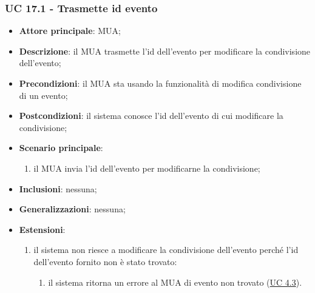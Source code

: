     \subsubsection{UC 17.1 - Trasmette id evento} \label{sec:UC17.1}
    \begin{itemize}
        \item \textbf{Attore principale}: MUA;
        \item \textbf{Descrizione}: il MUA trasmette l'id dell'evento per modificare la condivisione dell'evento;
        \item \textbf{Precondizioni}: il MUA sta usando la funzionalità di modifica condivisione di un evento;
        \item \textbf{Postcondizioni}: il sistema conosce l'id dell'evento di cui modificare la condivisione;
        \item \textbf{Scenario principale}:
            \begin{enumerate}
                \item il MUA invia l'id dell'evento per modificarne la condivisione;
            \end{enumerate}
        \item \textbf{Inclusioni}: nessuna;
        \item \textbf{Generalizzazioni}: nessuna;
        \item \textbf{Estensioni}:
            \begin{enumerate}[label=\alph*.]
                \item il sistema non riesce a modificare la condivisione dell'evento perché l'id dell'evento fornito non è stato trovato:
                \begin{enumerate}[label=\arabic*.]
                    \item il sistema ritorna un errore al MUA di evento non trovato (\hyperref[sec:UC4.3]{UC 4.3}).
                \end{enumerate}
            \end{enumerate}
    \end{itemize}


